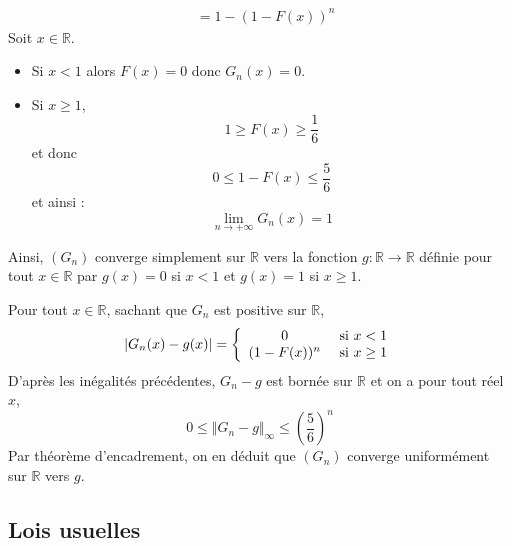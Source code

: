 \documentclass[a4paper,twoside,french,11pt]{VcCours}
\begin{document}
\begin{enumerate}
\begin{align*}
 & = 1-(1- F(x))^n 
\end{align*}
Soit $x \in \mathbb{R}$.
\begin{itemize}
\item Si $x<1$ alors $F(x)=0$ donc $G_n(x)=0$.
\item Si $x \geq 1$, 
$$1 \geq F(x) \geq \dfrac{1}{6}$$
et donc 
$$ 0 \leq 1- F(x) \leq \dfrac{5}{6}$$
et ainsi :
$$ \lim_{n \rightarrow + \infty} G_n(x) =1$$
\end{itemize}
Ainsi, $(G_n)$ converge simplement sur $\mathbb{R}$ vers la fonction $g : \mathbb{R} \rightarrow \mathbb{R}$ définie pour tout $x \in \mathbb{R}$ par $g(x) = 0$ si $x<1$ et $g(x)=1$ si $x \geq 1$. 

Pour tout $x \in \mathbb{R}$, sachant que $G_n$ est positive sur $\mathbb{R}$,
$$ \vert G_n(x) -g(x) \vert = \left\lbrace \begin{array}{cl}
0& \hbox{ si } x < 1 \\
(1-F(x))^n & \hbox{ si } x \geq 1  \\
\end{array}\right.$$
D'après les inégalités précédentes,  $G_n-g$ est bornée sur $\mathbb{R}$ et on a pour tout réel $x$,
$$0 \leq \Vert G_n -g \Vert_{\infty} \leq \left( \dfrac{5}{6} \right)^n$$
Par théorème d'encadrement, on en déduit que $(G_n)$ converge uniformément sur $\mathbb{R}$ vers $g$.


\end{enumerate}

\newpage


\subsection{Lois usuelles}
\end{document}
